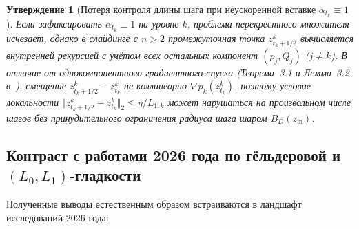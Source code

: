 \documentclass[11pt, a4paper]{article}
\newtheorem{proposition}{Утверждение}[section]
\theoremstyle{definition}
\begin{document}
\begin{proposition}[Потеря контроля длины шага при неускоренной вставке $\alpha_{t_k} \equiv 1$]\label{prop:obstruction_unacc}
Если зафиксировать $\alpha_{t_k} \equiv 1$ на уровне $k$, проблема перекрёстного множителя исчезает, однако в слайдинге с $n > 2$ промежуточная точка $z_{t_k + 1/2}^k$ вычисляется внутренней рекурсией с учётом всех остальных компонент $(p_j, Q_j)$ ($j \neq k$). В отличие от однокомпонентного градиентного спуска (Теорема~3.1 и Лемма~3.2 в~\cite{Gorbunov2024}), смещение $z_{t_k + 1/2}^k - z_{t_k}^k$ не коллинеарно $\nabla p_k(z_{t_k}^k)$, поэтому условие локальности $\Vert z_{t_k + 1/2}^k - z_{t_k}^k \Vert_2 \le \eta / L_{1,k}$ может нарушаться на произвольном числе шагов без принудительного ограничения радиуса шага шаром $\overline{B}_D(z_{\mathrm{in}})$.
\end{proposition}

\subsection{Контраст с работами 2026 года по гёльдеровой и $(L_0, L_1)$-гладкости}

Полученные выводы естественным образом встраиваются в ландшафт исследований 2026 года:
\end{document}
